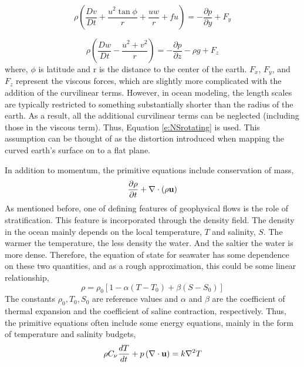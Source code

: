 \begin{equation}\label{e:ymomc}
    \rho \left ( \frac{Dv}{Dt} + \frac{u^2 \tan \phi}{r}+\frac{uw}{r}+fu \right ) = - \frac{\partial p}{\partial y} + F_y
\end{equation}

\begin{equation}\label{e:zmomc}
    \rho \left ( \frac{Dw}{Dt} - \frac{u^2+v^2}{r} \right) = - \frac{\partial p}{\partial z}-\rho g + F_z
\end{equation}
%
where, $\phi$ is latitude and r is the distance to the center of the earth.  $F_x$, $F_y$, and $F_z$ represent the viscous forces, which are slightly more complicated with the addition of the curvilinear terms.  However, in ocean modeling, the length scales are typically restricted to something substantially shorter than the radius of the earth.  As a result, all the additional curvilinear terms can be neglected (including those in the viscous term).  Thus, Equation \ref{e:NSrotating} is used.  This assumption can be thought of as the distortion introduced when mapping the curved earth's surface on to a flat plane.  

In addition to momentum, the primitive equations include conservation of mass, 
%
\begin{equation}\label{e:conto}
    \frac{\partial \rho}{\partial t} + \nabla \cdot (\rho {\bf u})
\end{equation}
%
As mentioned before, one of defining features of geophysical flows is the role of stratification.  This feature is incorporated through the density field.  The density in the ocean mainly depends on the local temperature, $T$ and salinity, $S$.  The warmer the temperature, the less density the water.  And the saltier the water is more dense.  Therefore, the equation of state for seawater has some dependence on these two quantities, and as a rough approximation, this could be some linear relationship, 
%
\begin{equation}\label{e:eqst}
    \rho = \rho_0 [1 - \alpha(T-T_0) + \beta(S - S_0) ]
\end{equation}
%
The constants $\rho_0, T_0, S_0$ are reference values and $\alpha$ and $\beta$ are the coefficient of thermal expansion and the coefficient of saline contraction, respectively.  Thus, the primitive equations often include some energy equations, mainly in the form of temperature and salinity budgets,
%
\begin{equation*}\label{e:eneroo}
    \rho C_\nu \frac{dT}{dt}+p \left ( \nabla \cdot {\bf u} \right ) = k \nabla^2 T
\end{equation*}

